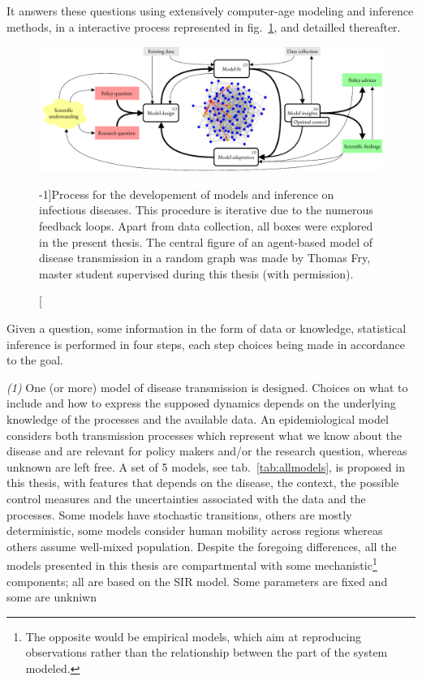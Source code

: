  It answers these questions using extensively computer-age modeling and inference methods, in a interactive process represented in fig.~\ref{fig:modeling}, and detailled thereafter. %
 \begin{figure}\centering
  \includegraphics{fig/modeling_cycle}
  \caption[Process for infectious disease modeling][-1\baselineskip]{Process for the developement of models and inference on infectious diseases. This procedure is iterative due to the numerous feedback loops. Apart from data collection, all boxes were explored in the present thesis. The central figure of an agent-based model of disease transmission in a random graph was made by Thomas Fry,  master student supervised during this thesis (with permission).}\label{fig:modeling}
\end{figure}

Given a question, some information in the form of data or knowledge, statistical inference is performed in four steps, each step choices being made in accordance to the goal.

\textit{(1)} One (or more) model of disease transmission is designed. Choices on what to include and how to express the supposed dynamics depends on the underlying knowledge of the processes and the available data. An epidemiological model considers both transmission processes which represent what we know about the disease and are relevant for policy makers and/or the research question, whereas unknown are left free. A set of 5 models, see tab.~\ref{tab:allmodels}, is proposed in this thesis, with features that depends on the disease, the context, the possible control measures and the uncertainties associated with the data and the processes. Some models have stochastic transitions, others are mostly deterministic, some models consider human mobility across regions whereas others assume well-mixed population. Despite the foregoing differences, all the models presented in this thesis are compartmental with some mechanistic\footnote{The opposite would be empirical models, which aim at reproducing observations rather than the relationship between the part of the system modeled.} components; all are based on the SIR model. Some parameters are fixed and some are unkniwn

